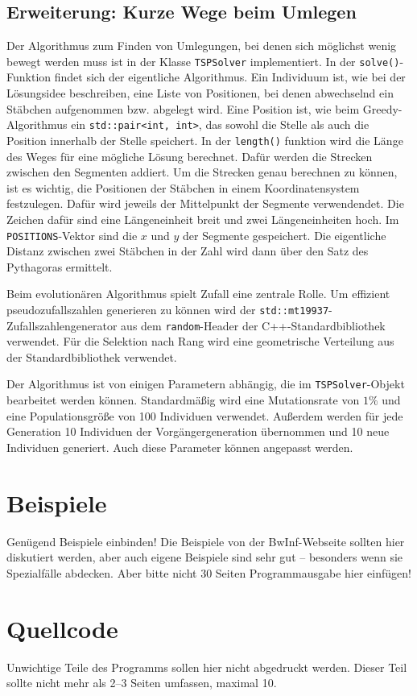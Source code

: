 \documentclass[a4paper,10pt,ngerman]{scrartcl}
\begin{document}
\subsection{Erweiterung: Kurze Wege beim Umlegen}
Der Algorithmus zum Finden von Umlegungen, bei denen sich möglichst wenig bewegt werden muss ist in der Klasse \lstinline{TSPSolver} implementiert. In der \lstinline{solve()}-Funktion findet sich der eigentliche Algorithmus. 
Ein Individuum ist, wie bei der Lösungsidee beschreiben, eine Liste von Positionen, bei denen abwechselnd ein Stäbchen aufgenommen bzw. abgelegt wird. Eine Position ist, wie beim Greedy-Algorithmus ein \lstinline{std::pair<int, int>}, das sowohl die Stelle als auch die Position innerhalb der Stelle speichert. 
In der \lstinline{length()} funktion wird die Länge des Weges für eine mögliche Lösung berechnet. 
Dafür werden die Strecken zwischen den Segmenten addiert. 
Um die Strecken genau berechnen zu können, ist es wichtig, die Positionen der Stäbchen in einem Koordinatensystem festzulegen. 
Dafür wird jeweils der Mittelpunkt der Segmente verwendendet.
Die Zeichen dafür sind eine Längeneinheit breit und zwei Längeneinheiten hoch.
Im \lstinline{POSITIONS}-Vektor sind die $x$ und $y$ der Segmente gespeichert. 
Die eigentliche Distanz zwischen zwei Stäbchen in der Zahl wird dann über den Satz des Pythagoras ermittelt. 

Beim evolutionären Algorithmus spielt Zufall eine zentrale Rolle. 
Um effizient pseudozufallszahlen generieren zu können wird der \lstinline{std::mt19937}-Zufallszahlengenerator aus dem \lstinline{random}-Header der C++-Standardbibliothek verwendet. 
Für die Selektion nach Rang wird eine geometrische Verteilung aus der Standardbibliothek verwendet.

Der Algorithmus ist von einigen Parametern abhängig, die im \lstinline{TSPSolver}-Objekt bearbeitet werden können. Standardmäßig wird eine Mutationsrate von $1\%$ und eine Populationsgröße von 100 Individuen verwendet. 
Außerdem werden für jede Generation 10 Individuen der Vorgängergeneration übernommen und 10 neue Individuen generiert. Auch diese Parameter können angepasst werden. 


\section{Beispiele}
Genügend Beispiele einbinden! Die Beispiele von der BwInf-Webseite sollten hier diskutiert werden, aber auch eigene Beispiele sind sehr gut – besonders wenn sie Spezialfälle abdecken. Aber bitte nicht 30 Seiten Programmausgabe hier einfügen!

\section{Quellcode}
Unwichtige Teile des Programms sollen hier nicht abgedruckt werden. Dieser Teil sollte nicht mehr als 2–3 Seiten umfassen, maximal 10.
\end{document}

